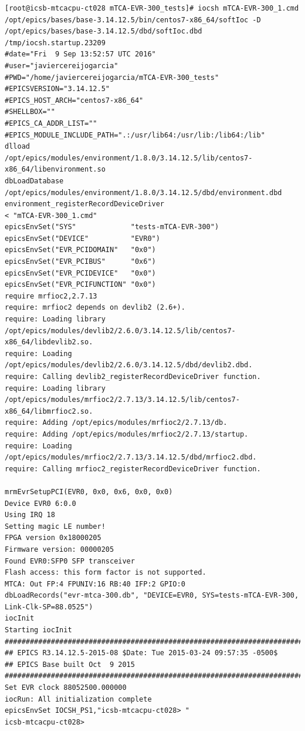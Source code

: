 \documentclass[11pt
  , a4paper
  , article
  , oneside
  , showtrims
]{memoir}
\begin{document}
\begin{lstlisting}[style=termstyle]
[root@icsb-mtcacpu-ct028 mTCA-EVR-300_tests]# iocsh mTCA-EVR-300_1.cmd 
/opt/epics/bases/base-3.14.12.5/bin/centos7-x86_64/softIoc -D /opt/epics/bases/base-3.14.12.5/dbd/softIoc.dbd /tmp/iocsh.startup.23209
#date="Fri  9 Sep 13:52:57 UTC 2016"
#user="javiercereijogarcia"
#PWD="/home/javiercereijogarcia/mTCA-EVR-300_tests"
#EPICSVERSION="3.14.12.5"
#EPICS_HOST_ARCH="centos7-x86_64"
#SHELLBOX=""
#EPICS_CA_ADDR_LIST=""
#EPICS_MODULE_INCLUDE_PATH=".:/usr/lib64:/usr/lib:/lib64:/lib"
dlload         /opt/epics/modules/environment/1.8.0/3.14.12.5/lib/centos7-x86_64/libenvironment.so
dbLoadDatabase /opt/epics/modules/environment/1.8.0/3.14.12.5/dbd/environment.dbd
environment_registerRecordDeviceDriver
< "mTCA-EVR-300_1.cmd"
epicsEnvSet("SYS"             "tests-mTCA-EVR-300")
epicsEnvSet("DEVICE"          "EVR0")
epicsEnvSet("EVR_PCIDOMAIN"   "0x0")
epicsEnvSet("EVR_PCIBUS"      "0x6")
epicsEnvSet("EVR_PCIDEVICE"   "0x0")
epicsEnvSet("EVR_PCIFUNCTION" "0x0")
require mrfioc2,2.7.13
require: mrfioc2 depends on devlib2 (2.6+).
require: Loading library /opt/epics/modules/devlib2/2.6.0/3.14.12.5/lib/centos7-x86_64/libdevlib2.so.
require: Loading /opt/epics/modules/devlib2/2.6.0/3.14.12.5/dbd/devlib2.dbd.
require: Calling devlib2_registerRecordDeviceDriver function.
require: Loading library /opt/epics/modules/mrfioc2/2.7.13/3.14.12.5/lib/centos7-x86_64/libmrfioc2.so.
require: Adding /opt/epics/modules/mrfioc2/2.7.13/db.
require: Adding /opt/epics/modules/mrfioc2/2.7.13/startup.
require: Loading /opt/epics/modules/mrfioc2/2.7.13/3.14.12.5/dbd/mrfioc2.dbd.
require: Calling mrfioc2_registerRecordDeviceDriver function.
 
mrmEvrSetupPCI(EVR0, 0x0, 0x6, 0x0, 0x0)
Device EVR0 6:0.0
Using IRQ 18
Setting magic LE number!
FPGA version 0x18000205
Firmware version: 00000205
Found EVR0:SFP0 SFP transceiver
Flash access: this form factor is not supported.
MTCA: Out FP:4 FPUNIV:16 RB:40 IFP:2 GPIO:0
dbLoadRecords("evr-mtca-300.db", "DEVICE=EVR0, SYS=tests-mTCA-EVR-300, Link-Clk-SP=88.0525")
iocInit
Starting iocInit
############################################################################
## EPICS R3.14.12.5-2015-08 $Date: Tue 2015-03-24 09:57:35 -0500$
## EPICS Base built Oct  9 2015
############################################################################
Set EVR clock 88052500.000000
iocRun: All initialization complete
epicsEnvSet IOCSH_PS1,"icsb-mtcacpu-ct028> "
icsb-mtcacpu-ct028>
\end{lstlisting}
\end{document}
